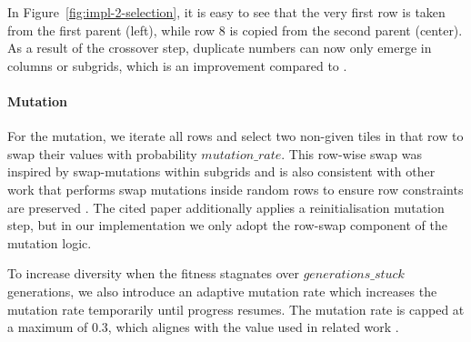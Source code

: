 In Figure~\ref{fig:impl-2-selection}, it is easy to see that the very first row is taken from the first parent (left), while row 8 is copied from the second parent (center). As a result of the crossover step, duplicate numbers can now only emerge in columns or subgrids, which is an improvement compared to .

\paragraph{Mutation} For the mutation, we iterate all rows and select two non-given tiles in that row to swap their values with probability \(mutation\_rate\). This row-wise swap was inspired by swap-mutations within subgrids and is also consistent with other work that performs swap mutations inside random rows to ensure row constraints are preserved \cite{Wang2024, Sato2011, Mantere2007}. The cited paper additionally applies a reinitialisation mutation step, but in our implementation we only adopt the row-swap component of the mutation logic.

To increase diversity when the fitness stagnates over $generations\_stuck$ generations, we also introduce an adaptive mutation rate which increases the mutation rate temporarily until progress resumes. The mutation rate is capped at a maximum of \(0.3\), which alignes with the value used in related work \cite{Sato2011}.

